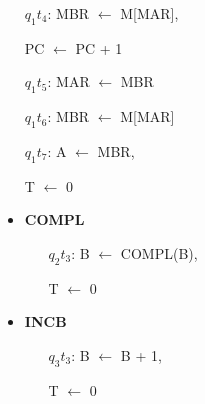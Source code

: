 \documentclass{article}
\begin{document}
\begin{table}[!htbp]
{\begin{minipage}{\textwidth}
\begin{multicols}{2}
\begin{itemize}
\begin{enumerate}[itemsep=-1ex]
                            \item[$q_1t_4$:] 
                            	MBR $\leftarrow$ M[MAR],
                            
                            	PC $\leftarrow$ PC + 1
                            
                            \item[$q_1t_5$:] 
                            	MAR $\leftarrow$ MBR
                            
                            \item[$q_1t_6$:] 
                            	MBR $\leftarrow$ M[MAR]
                            
                            \item[$q_1t_7$:] 
                            	A $\leftarrow$ MBR, 
                            
                            	T $\leftarrow$ 0
                        \end{enumerate}
                \end{itemize}
                
                
                
                
                \begin{itemize}
                    \item \textbf{COMPL}
                        \begin{enumerate}[itemsep=-1ex]  
                            \item[$q_2t_3$:] 
                                B $\leftarrow$ COMPL(B),
                                
                                T $\leftarrow$ 0
                    \end{enumerate}
                \end{itemize}
                
                
            
                
                \begin{itemize}
                    \item \textbf{INCB}
                        \begin{enumerate}[itemsep=-1ex] 
                            \item[$q_3 t_3$:]  
                                B $\leftarrow$ B + 1,
                                
                                T $\leftarrow$ 0
                                

\end{enumerate}
\end{itemize}
\end{multicols}
\end{minipage}}
\end{table}
\end{document}
